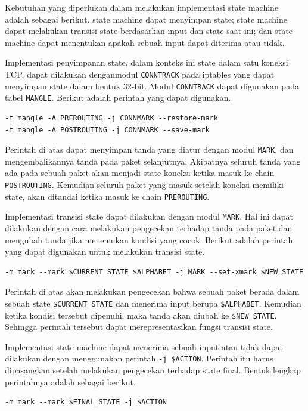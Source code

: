 Kebutuhan yang diperlukan dalam melakukan implementasi state machine adalah sebagai berikut. state machine dapat menyimpan state; state machine dapat melakukan transisi state berdasarkan input dan state saat ini; dan state machine dapat menentukan apakah sebuah input dapat diterima atau tidak.

Implementasi penyimpanan state, dalam konteks ini state dalam satu koneksi TCP, dapat dilakukan denganmodul \verb|CONNTRACK| pada iptables yang dapat menyimpan state dalam bentuk 32-bit. Modul \verb|CONNTRACK| dapat digunakan pada tabel \verb|MANGLE|. Berikut adalah perintah yang dapat digunakan.

\begin{lstlisting}
-t mangle -A PREROUTING -j CONNMARK --restore-mark
-t mangle -A POSTROUTING -j CONNMARK --save-mark
\end{lstlisting} 

Perintah di atas dapat menyimpan tanda yang diatur dengan modul \verb|MARK|, dan mengembalikannya tanda pada paket selanjutnya. Akibatnya seluruh tanda yang ada pada sebuah paket akan menjadi state koneksi ketika masuk ke chain \verb|POSTROUTING|. Kemudian seluruh paket yang masuk setelah koneksi memiliki state, akan ditandai ketika masuk ke chain \verb|PREROUTING|.

Implementasi transisi state dapat dilakukan dengan modul \verb|MARK|. Hal ini dapat dilakukan dengan cara melakukan pengecekan terhadap tanda pada paket dan mengubah tanda jika menemukan kondisi yang cocok. Berikut adalah perintah yang dapat digunakan untuk melakukan transisi state.

\begin{lstlisting}
-m mark --mark $CURRENT_STATE $ALPHABET -j MARK --set-xmark $NEW_STATE
\end{lstlisting}

Perintah di atas akan melakukan pengecekan bahwa sebuah paket berada dalam sebuah state \verb|$CURRENT_STATE| dan menerima input berupa \verb|$ALPHABET|. Kemudian ketika kondisi tersebut dipenuhi, maka tanda akan diubah ke \verb|$NEW_STATE|. Sehingga perintah tersebut dapat merepresentasikan fungsi transisi state.

Implementasi state machine dapat menerima sebuah input atau tidak dapat dilakukan dengan menggunakan perintah \verb|-j $ACTION|. Perintah itu harus dipasangkan setelah melakukan pengecekan terhadap state final. Bentuk lengkap perintahnya adalah sebagai berikut.

\begin{lstlisting}
-m mark --mark $FINAL_STATE -j $ACTION
\end{lstlisting}

